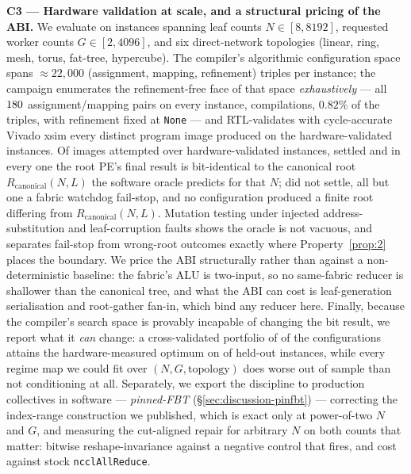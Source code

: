 \documentclass[journal,10pt]{IEEEtran}
\theoremstyle{plain}
\theoremstyle{definition}
\theoremstyle{remark}
\newcommand{\Rcan}{\ensuremath{R_{\mathrm{canonical}}}}
\newcommand{\sv}[1]{\texttt{#1}}
\begin{document}
\textbf{C3 --- Hardware validation at scale, and a structural pricing of the ABI.}
We evaluate on \SuiteSize{} instances spanning \InvLeafCounts{} leaf counts
$N \in [8,8192]$, requested worker counts $G \in [2,4096]$, and six
direct-network topologies (linear, ring, mesh, torus, fat-tree, hypercube).
The compiler's algorithmic configuration space spans
$\approx\!22{,}000$ (assignment, mapping, refinement) triples per instance;
the campaign enumerates the refinement-free face of that space
\emph{exhaustively} --- all $180$ assignment/mapping pairs on
every instance, \CompileTotal{} compilations, $0.82\%$ of the triples, with
refinement fixed at \sv{None} --- and RTL-validates with cycle-accurate
Vivado xsim every distinct program image produced on the \TournNInst{}
hardware-validated instances. Of \InvAttempted{} images
attempted over \TournNInst{} hardware-validated instances, \WallTBs{} settled
and in every one the root PE's final result is bit-identical to the canonical
root $\Rcan(N,L)$ the software oracle predicts for that $N$; \InvNonSettling{}
did not settle, all but one a fabric watchdog fail-stop, and no configuration
produced a finite root differing from $\Rcan(N,L)$. Mutation testing under
injected address-substitution and leaf-corruption faults shows the oracle is
not vacuous, and separates fail-stop from wrong-root outcomes exactly where
Property~\ref{prop:2} places the boundary. We price the ABI structurally
rather than against a non-deterministic baseline: the fabric's ALU is
two-input, so no same-fabric reducer is shallower than the canonical tree, and
what the ABI can cost is leaf-generation serialisation and root-gather fan-in,
which bind any reducer here. Finally, because the compiler's search space is
provably incapable of changing the bit result, we report what it \emph{can}
change: a cross-validated portfolio of \SelConfigsRun{} of the
\SelConfigsTotal{} configurations attains the hardware-measured optimum on
\SelKFourOpt{} of \TournNInst{} held-out instances, while every regime map we
could fit over $(N, G, \text{topology})$ does worse out of sample than not
conditioning at all. Separately, we export the discipline to production
collectives in software --- \emph{pinned-FBT} (\S\ref{sec:discussion-pinfbt})
--- correcting the index-range construction we published, which is exact only
at power-of-two $N$ and $G$, and measuring the cut-aligned repair for arbitrary
$N$ on both counts that matter: bitwise reshape-invariance against a negative
control that fires, and cost against stock \texttt{ncclAllReduce}.
\end{document}

